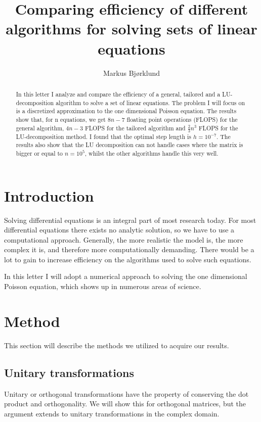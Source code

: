 \documentclass{emulateapj}
\begin{document}
\title{Comparing efficiency of different algorithms for solving sets of linear equations}

\author{Markus Bjørklund}



\begin{abstract}
In this letter I analyze and compare the efficiency of a general, tailored and a LU-decomposition algorithm to solve a set of linear equations. The problem I will focus on is a discretized approximation to the one dimensional Poisson equation. The results show that, for n equations, we get $8n-7$ floating point operations (FLOPS) for the general algorithm, $4n-3$ FLOPS for the tailored algorithm and $\frac{2}{3}n^3$ FLOPS for the LU-decomposition method. I found that the optimal step length is $h=10^{-7}$. The results also show that the LU decomposition can not handle cases where the matrix is bigger or equal to $n=10^5$, whilst the other algorithms handle this very well.

\end{abstract}

\section{Introduction}
\label{sec:introduction}
Solving differential equations is an integral part of most research today. For most differential equations there exists no analytic solution, so we have to use a computational approach. Generally, the more realistic the model is, the more complex it is, and therefore more computationally demanding. There would be a lot to gain to increase efficiency on the algorithms used to solve such equations.

In this letter I will adopt a numerical approach to solving the one dimensional Poisson equation, which shows up in numerous areas of science.

\section{Method}
\label{sec:method}
This section will describe the methods we utilized to acquire our results.
\subsection{Unitary transformations}
Unitary or orthogonal transformations have the property of conserving the dot product and orthogonality. We will show this for orthogonal matrices, but the argument extends to unitary transformations in the complex domain.
\end{document}
